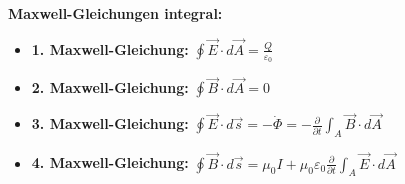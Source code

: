 \documentclass[german]{latex4ei/latex4ei_sheet}
\begin{document}
\begin{sectionbox}
    \textbf{Maxwell-Gleichungen integral:}\\
    \begin{itemize}
        \item \textbf{1. Maxwell-Gleichung:} $\oint \vec{E} \cdot d\vec{A} = \frac{Q}{\varepsilon_0}$\\
        \item \textbf{2. Maxwell-Gleichung:} $\oint \vec{B} \cdot d\vec{A} = 0$\\
        \item \textbf{3. Maxwell-Gleichung:} $\oint \vec{E} \cdot d\vec{s} = -\dot{\Phi} = -\frac{\partial}{\partial t}\int_{A}\vec{B} \cdot d\vec{A}$\\
        \item \textbf{4. Maxwell-Gleichung:} $\oint \vec{B} \cdot d\vec{s} = \mu_0 I + \mu_0\varepsilon_0\frac{\partial}{\partial t}\int_{A}\vec{E} \cdot d\vec{A}$\\
    \end{itemize}
\end{sectionbox}
\end{document}
